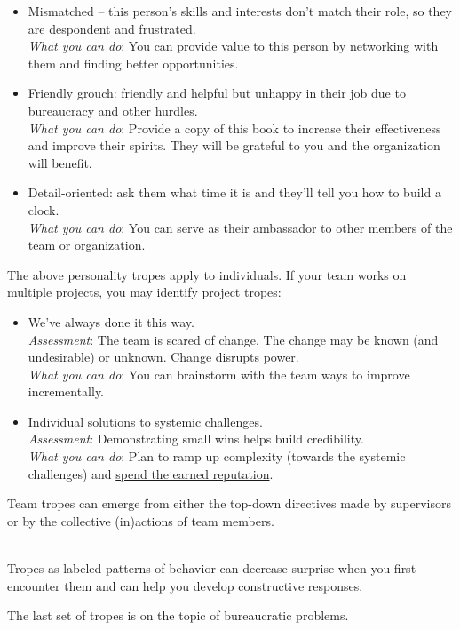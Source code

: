 \begin{itemize}
    \item Mismatched -- this person's skills and interests don't match their role, so they are despondent and frustrated. \\
    \textit{What you can do}: You can provide value to this person by networking with them and finding better opportunities.
    
    \item Friendly grouch: friendly and helpful but unhappy in their job due to bureaucracy and other hurdles. \\
    \textit{What you can do}: Provide a copy of this book to increase their effectiveness and improve their spirits. They will be grateful to you and the organization will benefit.
    
    \item Detail-oriented: ask them what time it is and they'll tell you how to build a clock. \\
    \textit{What you can do}: You can serve as their ambassador to other members of the team or organization.  
\end{itemize}


The above personality tropes apply to individuals. If your team works on multiple projects, you may identify project tropes:
\begin{itemize}
    \item We've always done it this way.\\
    \textit{Assessment}: The team is scared of change. The change may be known (and undesirable) or unknown. Change disrupts power.\\
    \textit{What you can do}: You can brainstorm with the team ways to improve incrementally. 

    \item Individual solutions to systemic challenges.\\
    \textit{Assessment}: Demonstrating small wins helps build credibility. \\
    \textit{What you can do}: Plan to ramp up  complexity (towards the systemic challenges) and \hyperref[sec:reputation]{spend the earned reputation}.
\end{itemize}
Team tropes can emerge from either the top-down directives made by supervisors or by the collective (in)actions of team members.


\ \\


Tropes as labeled patterns of behavior can decrease surprise when you first encounter them and can help you develop constructive responses. 

The last set of tropes is on the topic of bureaucratic problems. 